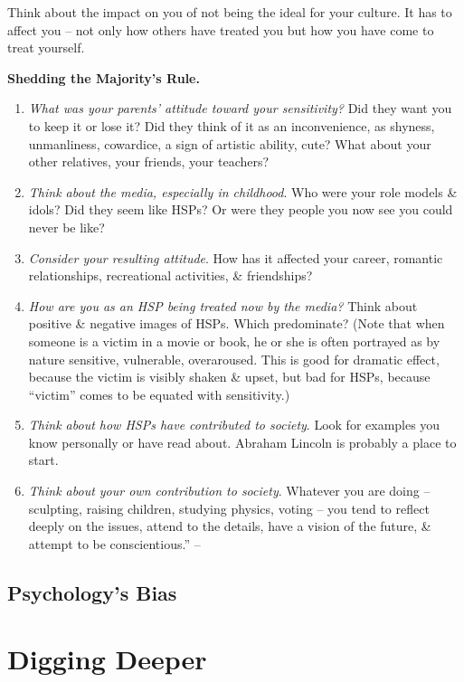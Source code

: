 \documentclass{article}
\numberwithin{equation}{section}
\begin{document}
Think about the impact on you of not being the ideal for your culture. It has to affect you -- not only how others have treated you but how you have come to treat yourself.

\textbf{Shedding the Majority's Rule.}
\begin{enumerate}
	\item \textit{What was your parents' attitude toward your sensitivity?} Did they want you to keep it or lose it? Did they think of it as an inconvenience, as shyness, unmanliness, cowardice, a sign of artistic ability, cute? What about your other relatives, your friends, your teachers?
	\item \textit{Think about the media, especially in childhood}. Who were your role models \& idols? Did they seem like HSPs? Or were they people you now see you could never be like?
	\item \textit{Consider your resulting attitude}. How has it affected your career, romantic relationships, recreational activities, \& friendships?
	\item \textit{How are you as an HSP being treated now by the media?} Think about positive \& negative images of HSPs. Which predominate? (Note that when someone is a victim in a movie or book, he or she is often portrayed as by nature sensitive, vulnerable, overaroused. This is good for dramatic effect, because the victim is visibly shaken \& upset, but bad for HSPs, because ``victim'' comes to be equated with sensitivity.)
	\item \textit{Think about how HSPs have contributed to society}. Look for examples you know personally or have read about. Abraham Lincoln is probably a place to start.
	\item \textit{Think about your own contribution to society}. Whatever you are doing -- sculpting, raising children, studying physics, voting -- you tend to reflect deeply on the issues, attend to the details, have a vision of the future, \& attempt to be conscientious.'' -- \cite[pp. 47--50]{Aron2013}
\end{enumerate}

\subsection{Psychology's Bias}


\section{Digging Deeper}
\end{document}
